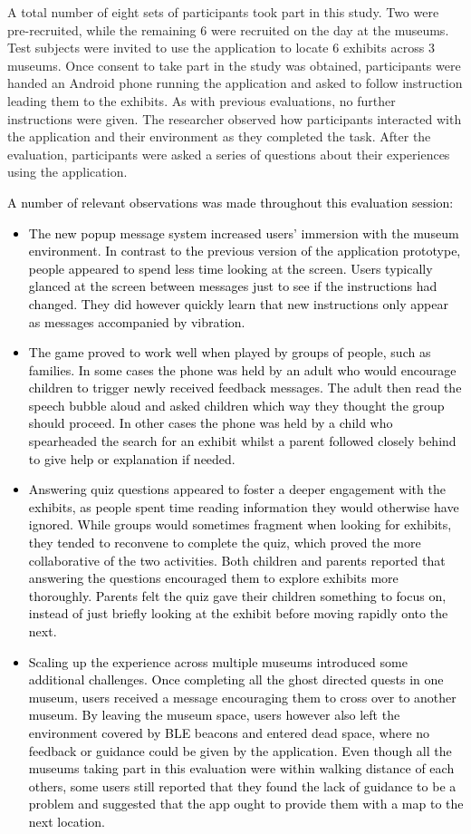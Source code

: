 \documentclass[prodmode,acmtomm]{acmsmall}
\begin{document}
A total number of eight sets of participants took part in this study. Two were pre-recruited, while the remaining 6 were recruited on the day at the museums. Test subjects were invited to use the application to locate 6 exhibits across 3 museums. Once consent to take part in the study was obtained, participants were handed an Android phone running the application and asked to follow instruction leading them to the exhibits. As with previous evaluations, no further instructions were given. The researcher observed how participants interacted with the application and their environment as they completed the task. After the evaluation, participants were asked a series of questions about their experiences using the application. 

\textcolor{black}{
A number of relevant observations was made throughout this evaluation session:
\begin{itemize}
\item The new popup message system increased users' immersion with the museum environment. In contrast to the previous version of the application prototype, people appeared to spend less time looking at the screen. Users typically glanced at the screen between messages just to see if the instructions had changed. They did however quickly learn that new instructions only appear as messages accompanied by vibration. 
\item The game proved to work well when played by groups of people, such as families. In some cases the phone was held by an adult who would encourage children to trigger newly received feedback messages. The adult then read the speech bubble aloud and asked children which way they thought the group should proceed. In other cases the phone was held by a child who spearheaded the search for an exhibit whilst a parent followed closely behind to give help or explanation if needed.
\item Answering quiz questions appeared to foster a deeper engagement with the exhibits, as people spent time reading information they would otherwise have ignored. While groups would sometimes fragment when looking for exhibits, they tended to reconvene to complete the quiz, which proved the more collaborative of the two activities. Both children and parents reported that answering the questions encouraged them to explore exhibits more thoroughly. Parents felt the quiz gave their children something to focus on, instead of just briefly looking at the exhibit before moving rapidly onto the next. 
\item Scaling up the experience across multiple museums introduced some additional challenges. Once completing all the ghost directed quests in one museum, users received a message encouraging them to cross over to another museum. By leaving the museum space, users however also left the environment covered by BLE beacons and entered dead space, where no feedback or guidance could be given by the application. Even though all the museums taking part in this evaluation were within walking distance of each others, some users still reported that they found the lack of guidance to be a problem and suggested that the app ought to provide them with a map to the next location.
\end{itemize}
}
\end{document}
